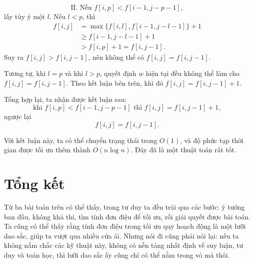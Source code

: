 \documentclass[11pt]{article}
\begin{document}
\[
  \text{II. Nếu } f[i,p]<f[i-1,j-p-1],
\]
lấy tùy ý một $l$. Nếu $l<p$, thì
\[
\begin{aligned}
  f[i,j]
  &= \max\{f[i,l],f[i-1,j-l-1]\}+1 \\
  &\ge f[i-1,j-l-1]+1 \\
  &> f[i,p]+1=f[i,j-1].
\end{aligned}
\]
Suy ra $f[i,j]>f[i,j-1]$, nên không thể có $f[i,j]=f[i,j-1]$.

Tương tự, khi $l=p$ và khi $l>p$, quyết định $w$ hiện tại đều không thể làm
cho $f[i,j]=f[i,j-1]$. Theo kết luận bên trên, khi đó
$f[i,j]=f[i,j-1]+1$.

Tổng hợp lại, ta nhận được kết luận sau:
\[
  \text{khi } f[i,p]<f[i-1,j-p-1]\text{ thì }f[i,j]=f[i,j-1]+1,
\]
ngược lại
\[
  f[i,j]=f[i,j-1].
\]

Với kết luận này, ta có thể chuyển trạng thái trong $O(1)$, và độ phức tạp
thời gian được tối ưu thêm thành $O(n\log n)$. Đây đã là một thuật toán rất
tốt.

\section*{Tổng kết}

Từ ba bài toán trên có thể thấy, trong tư duy ta đều trải qua các bước:
ý tưởng ban đầu, không khả thi, tìm tính đơn điệu để tối ưu, rồi giải quyết
được bài toán. Ta cũng có thể thấy rằng tính đơn điệu trong tối ưu quy hoạch
động là một lưỡi dao sắc, giúp ta vượt qua nhiều cửa ải. Nhưng nói đi cũng
phải nói lại: nếu ta không nắm chắc các kỹ thuật này, không có nền tảng nhất
định về suy luận, tư duy và toán học, thì lưỡi dao sắc ấy cũng chỉ có thể nằm
trong vỏ mà thôi.
\end{document}
